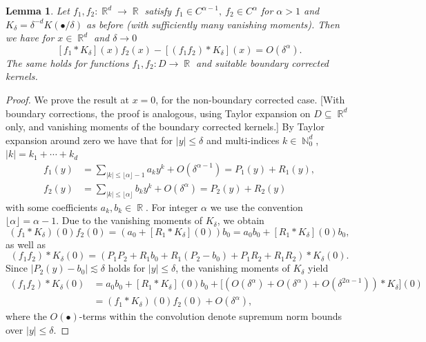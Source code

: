 \documentclass{article}
\numberwithin{equation}{section}
\newtheorem{lemma}[satz]{Lemma}
\theoremstyle{definition}
\DeclareMathOperator{\R}{{\mathbb R}}
\DeclareMathOperator{\N}{{\mathbb N}}
\renewcommand{\cdot}{{\scriptstyle \bullet} }
\providecommand{\abs}[1]{\lvert #1 \rvert}
\providecommand{\floor}[1]{\lfloor #1 \rfloor}
\renewcommand{\le}{\leqslant}
\begin{document}
\begin{lemma}\label{lemma-reiss}
    Let $f_1,f_2:\R^d\to \R$ satisfy $f_1\in C^{\alpha-1},~f_2\in C^\alpha$ for  $\alpha> 1$ and $K_\delta=\delta^{-d}K(\cdot/\delta)$ as before (with sufficiently many vanishing moments). Then we have for $x\in \R^d$ and $\delta\to 0$
    \[ [f_1\ast K_\delta](x) f_2 (x) - [(f_1f_2)\ast K_\delta] (x)= O(\delta^\alpha). \]
    The same holds for functions $f_1,f_2:D\to \R$ and suitable boundary corrected kernels.
\end{lemma}
\begin{proof}
    We prove the result at $x=0$, for the non-boundary corrected case. [With boundary corrections, the proof is analogous, using Taylor expansion on $D\subseteq \R^d$ only, and vanishing moments of the boundary corrected kernels.] By Taylor expansion around zero we have that for $|y|\le \delta$ and multi-indices $k\in\N_0^d$, $\abs{k}=k_1+\cdots+k_d$
    \[\begin{aligned}
        f_1(y) &= \sum_{\abs{k}\le\floor{\alpha}-1}a_k y^k + O(\delta^{\alpha-1})= P_1(y) + R_1(y),\\
    f_2(y) &= \sum_{\abs{k}\le \floor{\alpha}}b_k y^k + O(\delta^{\alpha})= P_2(y) + R_2(y)
    \end{aligned} \] 
with some coefficients $a_k,b_k\in\R$. For integer $\alpha$ we use the convention $\floor{\alpha}=\alpha-1$.
 Due to the vanishing moments of $K_\delta$, we obtain
    \[ (f_1\ast K_\delta)(0)f_2 (0) = (a_0 + [R_1\ast K_\delta] (0) ) b_0= a_0b_0 + [R_1\ast K_\delta] (0) b_0, \]
    as well as
    \[ (f_1f_2)\ast K_\delta (0) = (P_1P_2 + R_1 b_0 + R_1 (P_2-b_0) + P_1R_2 + R_1R_2 )\ast K_\delta (0). \]
    Since $|P_2(y)-b_0 |\lesssim \delta $ holds for $|y|\le \delta$, the vanishing moments of $K_\delta$ yield
 \[ \begin{aligned}
(f_1f_2)\ast K_\delta (0) &=a_0b_0+ [R_1\ast K_\delta](0) b_0 + \big[( O(\delta^\alpha) + O(\delta^\alpha)  + O(\delta^{2\alpha-1}) )\ast K_\delta\big](0)\\
&= (f_1\ast K_\delta)(0)f_2 (0) + O(\delta^\alpha),
 \end{aligned} \]
 where the $O(\cdot)$-terms within the convolution denote supremum norm bounds over $\abs{y}\le\delta$.
\end{proof}
\end{document}
